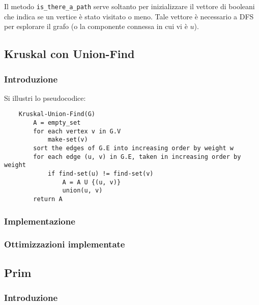 Il metodo \verb|is_there_a_path| serve soltanto per inizializzare
il vettore di booleani che indica se un vertice è stato visitato o meno.
Tale vettore è necessario a DFS per esplorare il grafo (o la
componente connessa in cui vi è $u$).

\subsection{Kruskal con Union-Find}

\subsubsection{Introduzione}

Si illustri lo pseudocodice:
\begin{verbatim}
    Kruskal-Union-Find(G)
        A = empty_set
        for each vertex v in G.V
            make-set(v)
        sort the edges of G.E into increasing order by weight w
        for each edge (u, v) in G.E, taken in increasing order by weight
            if find-set(u) != find-set(v)
                A = A U {(u, v)}
                union(u, v)
        return A
\end{verbatim}

\subsubsection{Implementazione}

\subsubsection{Ottimizzazioni implementate}

\subsection{Prim}

\subsubsection{Introduzione}

